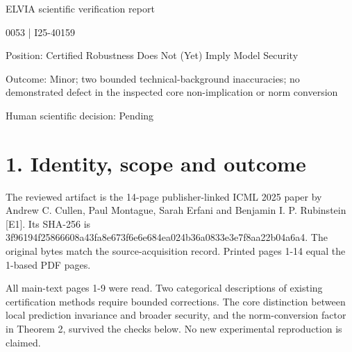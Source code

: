 \documentclass[10pt]{article}
\begin{document}
ELVIA scientific verification report\par
0053 | I25-40159\par
Position: Certified Robustness Does Not (Yet) Imply Model Security\par
Outcome: Minor; two bounded technical-background inaccuracies; no demonstrated defect in the inspected core non-implication or norm conversion\par
Human scientific decision: Pending\par
\section*{1. Identity, scope and outcome}
The reviewed artifact is the 14-page publisher-linked ICML 2025 paper by Andrew C. Cullen, Paul Montague, Sarah Erfani and Benjamin I. P. Rubinstein [E1]. Its SHA-256 is 3f96194f25866608a43fa8e673f6e6e684ea024b36a0833e3e7f8aa22b04a6a4. The original bytes match the source-acquisition record. Printed pages 1-14 equal the 1-based PDF pages.\par
All main-text pages 1-9 were read. Two categorical descriptions of existing certification methods require bounded corrections. The core distinction between local prediction invariance and broader security, and the norm-conversion factor in Theorem 2, survived the checks below. No new experimental reproduction is claimed.\par
\end{document}
